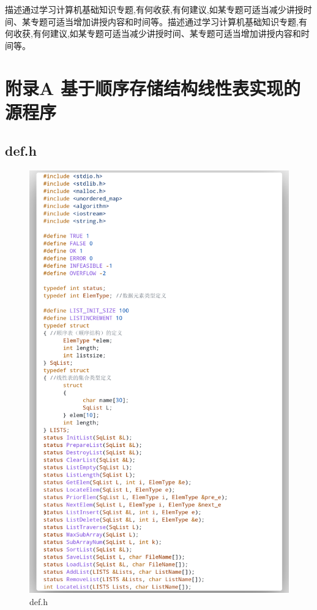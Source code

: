 \documentclass[supercite]{Experimental_Report}
\theoremstyle{definition}
\begin{document}
描述通过学习计算机基础知识专题,有何收获,有何建议,如某专题可适当减少讲授时间、某专题可适当增加讲授内容和时间等。描述通过学习计算机基础知识专题,有何收获,有何建议,如某专题可适当减少讲授时间、某专题可适当增加讲授内容和时间等。


\nocite{*} %



\setcounter{secnumdepth}{0}
\appendix

\section{附录A 基于顺序存储结构线性表实现的源程序}

\subsection{def.h}

\begin{figure}[htb]
	\begin{center}
		\includegraphics[scale=0.30]{images/3-1.png}
		\caption{def.h}
		\label{fig3-1}
	\end{center}
\end{figure}
\end{document}
